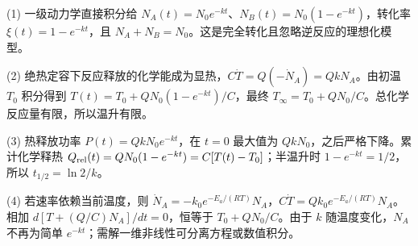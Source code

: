 (1) 一级动力学直接积分给 \(N_A(t)=N_0e^{-kt}\)、\(N_B(t)=N_0(1-e^{-kt})\)，转化率 \(\xi(t)=1-e^{-kt}\)，且 \(N_A+N_B=N_0\)。这是完全转化且忽略逆反应的理想化模型。

(2) 绝热定容下反应释放的化学能成为显热，\(C\dot T=Q(-\dot N_A)=QkN_A\)。由初温 \(T_0\) 积分得到 \(T(t)=T_0+QN_0(1-e^{-kt})/C\)，最终 \(T_\infty=T_0+QN_0/C\)。总化学反应量有限，所以温升有限。

(3) 热释放功率 \(P(t)=QkN_0e^{-kt}\)，在 \(t=0\) 最大值为 \(QkN_0\)，之后严格下降。累计化学释热 \(Q_{\rm rel}(t)=QN_0(1-e^{-kt})=C[T(t)-T_0]\)；半温升时 \(1-e^{-kt}=1/2\)，所以 \(t_{1/2}=\ln2/k\)。

(4) 若速率依赖当前温度，则 \(\dot N_A=-k_0e^{-E_a/(RT)}N_A\)，\(C\dot T=Qk_0e^{-E_a/(RT)}N_A\)。相加 \(d[T+(Q/C)N_A]/dt=0\)，恒等于 \(T_0+QN_0/C\)。由于 \(k\) 随温度变化，\(N_A\) 不再为简单 \(e^{-kt}\)；需解一维非线性可分离方程或数值积分。
